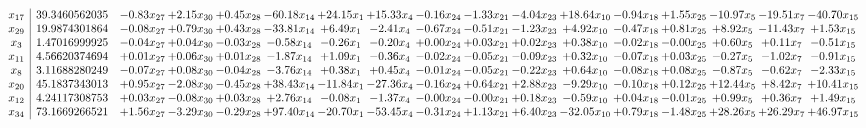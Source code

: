 \documentclass[9pt]{article}
\begin{document}
 \[\begin{array}{c| c c@{\hskip 2pt} c@{\hskip 2pt} c@{\hskip 2pt} c@{\hskip 2pt} c@{\hskip 2pt} c@{\hskip 2pt} c@{\hskip 2pt} c@{\hskip 2pt} c@{\hskip 2pt} c@{\hskip 2pt} c@{\hskip 2pt} c@{\hskip 2pt} c@{\hskip 2pt} c@{\hskip 2pt} c@{\hskip 2pt} }
 x_{17}   &  39.3460562035 & -0.83 x_{27} & +  2.15 x_{30} & +  0.45 x_{28} & -60.18 x_{14} & + 24.15 x_{1} & + 15.33 x_{4} & -0.16 x_{24} & -1.33 x_{21} & -4.04 x_{23} & + 18.64 x_{10} & -0.94 x_{18} & +  1.55 x_{25} & -10.97 x_{5} & -19.51 x_{7} & -40.70 x_{15}\\
 x_{29}   &  19.9874301864 & -0.08 x_{27} & +  0.79 x_{30} & +  0.43 x_{28} & -33.81 x_{14} & +  6.49 x_{1} & -2.41 x_{4} & -0.67 x_{24} & -0.51 x_{21} & -1.23 x_{23} & +  4.92 x_{10} & -0.47 x_{18} & +  0.81 x_{25} & +  8.92 x_{5} & -11.43 x_{7} & +  1.53 x_{15}\\
 x_{3}   &  1.47016999925 & -0.04 x_{27} & +  0.04 x_{30} & -0.03 x_{28} & -0.58 x_{14} & -0.26 x_{1} & -0.20 x_{4} & +  0.00 x_{24} & +  0.03 x_{21} & +  0.02 x_{23} & +  0.38 x_{10} & -0.02 x_{18} & -0.00 x_{25} & +  0.60 x_{5} & +  0.11 x_{7} & -0.51 x_{15}\\
 x_{11}   &  4.56620374694 & +  0.01 x_{27} & +  0.06 x_{30} & +  0.01 x_{28} & -1.87 x_{14} & +  1.09 x_{1} & -0.36 x_{4} & -0.02 x_{24} & -0.05 x_{21} & -0.09 x_{23} & +  0.32 x_{10} & -0.07 x_{18} & +  0.03 x_{25} & -0.27 x_{5} & -1.02 x_{7} & -0.91 x_{15}\\
 x_{8}   &  3.11688280249 & -0.07 x_{27} & +  0.08 x_{30} & -0.04 x_{28} & -3.76 x_{14} & +  0.38 x_{1} & +  0.45 x_{4} & -0.01 x_{24} & -0.05 x_{21} & -0.22 x_{23} & +  0.64 x_{10} & -0.08 x_{18} & +  0.08 x_{25} & -0.87 x_{5} & -0.62 x_{7} & -2.33 x_{15}\\
 x_{20}   &  45.1837343013 & +  0.95 x_{27} & -2.08 x_{30} & -0.45 x_{28} & + 38.43 x_{14} & -11.84 x_{1} & -27.36 x_{4} & -0.16 x_{24} & +  0.64 x_{21} & +  2.88 x_{23} & -9.29 x_{10} & -0.10 x_{18} & +  0.12 x_{25} & + 12.44 x_{5} & +  8.42 x_{7} & + 10.41 x_{15}\\
 x_{12}   &  4.24117308753 & +  0.03 x_{27} & -0.08 x_{30} & +  0.03 x_{28} & +  2.76 x_{14} & -0.08 x_{1} & -1.37 x_{4} & -0.00 x_{24} & -0.00 x_{21} & +  0.18 x_{23} & -0.59 x_{10} & +  0.04 x_{18} & -0.01 x_{25} & +  0.99 x_{5} & +  0.36 x_{7} & +  1.49 x_{15}\\
 x_{34}   &  73.1669266521 & +  1.56 x_{27} & -3.29 x_{30} & -0.29 x_{28} & + 97.40 x_{14} & -20.70 x_{1} & -53.45 x_{4} & -0.31 x_{24} & +  1.13 x_{21} & +  6.40 x_{23} & -32.05 x_{10} & +  0.79 x_{18} & -1.48 x_{25} & + 28.26 x_{5} & + 26.29 x_{7} & + 46.97 x_{15}\\

\end{array}\]
\end{document}
